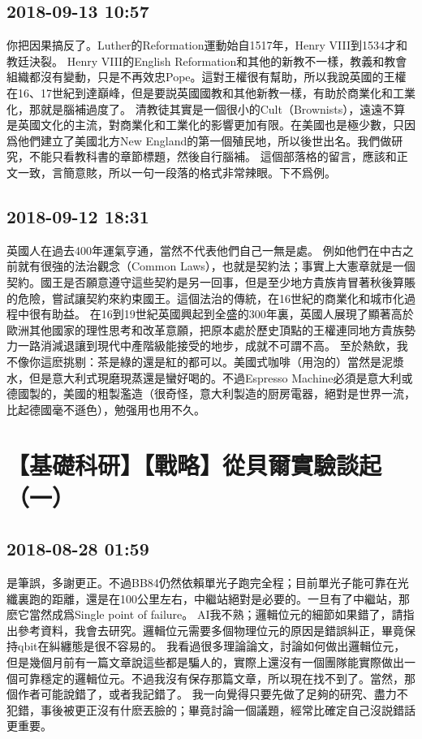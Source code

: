 \documentclass[twocolumn]{ctexart}
\begin{document}
\subsection*{2018-09-13 10:57}

你把因果搞反了。Luther的Reformation運動始自1517年，Henry VIII到1534才和教廷決裂。
Henry VIII的English Reformation和其他的新教不一樣，教義和教會組織都沒有變動，只是不再效忠Pope。這對王權很有幫助，所以我說英國的王權在16、17世紀到達巔峰，但是要説英國國教和其他新教一樣，有助於商業化和工業化，那就是腦補過度了。
清教徒其實是一個很小的Cult（Brownists），遠遠不算是英國文化的主流，對商業化和工業化的影響更加有限。在美國也是極少數，只因爲他們建立了美國北方New England的第一個殖民地，所以後世出名。我們做研究，不能只看教科書的章節標題，然後自行腦補。
這個部落格的留言，應該和正文一致，言簡意賅，所以一句一段落的格式非常辣眼。下不爲例。
\subsection*{2018-09-12 18:31}

英國人在過去400年運氣亨通，當然不代表他們自己一無是處。
例如他們在中古之前就有很強的法治觀念（Common Laws），也就是契約法；事實上大憲章就是一個契約。國王是否願意遵守這些契約是另一回事，但是至少地方貴族肯冒著秋後算賬的危險，嘗試讓契約來約束國王。這個法治的傳統，在16世紀的商業化和城市化過程中很有助益。
在16到19世紀英國興起到全盛的300年裏，英國人展現了顯著高於歐洲其他國家的理性思考和改革意願，把原本處於歷史頂點的王權連同地方貴族勢力一路消減退讓到現代中產階級能接受的地步，成就不可謂不高。
至於熱飲，我不像你這麽挑剔：茶是綠的還是紅的都可以。美國式咖啡（用泡的）當然是泥漿水，但是意大利式現磨現蒸還是蠻好喝的。不過Espresso Machine必須是意大利或德國製的，美國的粗製濫造（很奇怪，意大利製造的厨房電器，絕對是世界一流，比起德國毫不遜色），勉强用也用不久。
\section*{【基礎科研】【戰略】從貝爾實驗談起（一）}
\subsection*{2018-08-28 01:59}

是筆誤，多謝更正。不過BB84仍然依賴單光子跑完全程；目前單光子能可靠在光纖裏跑的距離，還是在100公里左右，中繼站絕對是必要的。一旦有了中繼站，那麽它當然成爲Single point of failure。
AI我不熟；邏輯位元的細節如果錯了，請指出參考資料，我會去研究。邏輯位元需要多個物理位元的原因是錯誤糾正，畢竟保持qbit在糾纏態是很不容易的。
我看過很多理論論文，討論如何做出邏輯位元，但是幾個月前有一篇文章說這些都是騙人的，實際上還沒有一個團隊能實際做出一個可靠穩定的邏輯位元。不過我沒有保存那篇文章，所以現在找不到了。當然，那個作者可能說錯了，或者我記錯了。
我一向覺得只要先做了足夠的研究、盡力不犯錯，事後被更正沒有什麽丟臉的；畢竟討論一個議題，經常比確定自己沒説錯話更重要。
\end{document}
